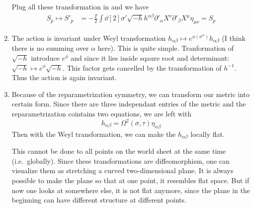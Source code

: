 \begin{enumerate}[label=(\alph*)]
		Plug all these transformation in and we have
		\begin{align}
			S_p \mapsto S'_p 
								  &= - \frac{T}{2} \int \dd[2]{\sigma'} \sqrt{-h} h^{\alpha\beta} \partial'_\alpha X^\nu \partial'_\beta X^\mu  \eta_{\mu\nu} = S_p
		\end{align}
	\item The action is invariant under Weyl transformation $h_{\alpha\beta} \mapsto e^{\phi(\sigma^\alpha)} h_{\alpha\beta}$ (I think there is no summing over $\alpha$ here). This is quite simple. Tranformation of $\sqrt{-h}$ introduce $e^{\phi}$ and since it lies inside sqaure root and determinant: $\sqrt{-h} \mapsto e^{\phi}\sqrt{-h}$. This factor gets cancelled by the transformation of $h^{-1}$. Thus the action is again invariant.
	\item 
		Because of the reparametrization symmetry, we can transform our metric into certain form. Since there are three independant entries of the metric and the reparametrization cointains two equations, we are left with
		\begin{equation}
			h_{\alpha \beta} = \Omega^2(\sigma, \tau) \eta_{\alpha\beta}
		\end{equation}
		Then with the Weyl transformation, we can make the $h_{\alpha \beta} $ locally flat.

		This cannot be done to all points on the world sheet at the same time (i.e.~globally). Since these transformations are diffeomorphism, one can visualize them as stretching a curved two-dimensional plane. It is always possible to make the plane so that at one point, it resembles flat space. But if now one looks at somewhere else, it is not flat anymore, since the plane in the beginning can have different structure at different points.
\end{enumerate}
